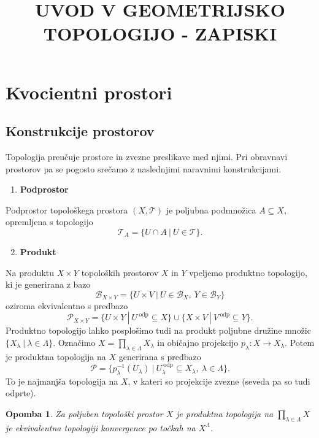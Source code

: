 \documentclass[10pt, a4paper]{article}
\newtheorem*{opomba}{Opomba}
\begin{document}
\title{UVOD V GEOMETRIJSKO TOPOLOGIJO - ZAPISKI}
\date{}
\maketitle

\section{Kvocientni prostori}

\subsection{Konstrukcije prostorov}

Topologija preučuje prostore in zvezne preslikave med njimi.
Pri obravnavi prostorov pa se pogosto srečamo z naslednjimi
naravnimi konstrukcijami.

\begin{enumerate}
  \item \textbf{Podprostor}
\end{enumerate}

Podprostor topološkega prostora $(X, \mathcal{T})$
je poljubna podmnožica $A \subseteq X$, opremljena s topologijo 
$$\mathcal{T}_A = \{U \cap A\ |\ U \in \mathcal{T} \}.$$

\begin{enumerate}
  \setcounter{enumi}{1}
  \item \textbf{Produkt}
\end{enumerate}

Na produktu $X \times Y$ topoloških prostorov 
$X$ in $Y$ vpeljemo produktno topologijo, ki je generirana z bazo 
$$\mathcal{B}_{X \times Y} = \{U \times V\ |\ U \in \mathcal{B}_X,\ Y \in \mathcal{B}_Y\}$$
oziroma ekvivalentno s predbazo 
$$\mathcal{P}_{X \times Y} = \{U \times Y\ |\ U^{\ \text{odp}} \subseteq X\} \cup \{X \times V\ |\ V^{\ \text{odp}} \subseteq Y\}.$$
Produktno topologijo lahko posplošimo tudi na produkt poljubne družine množic $\{X_\lambda\ |\ \lambda \in \Lambda\}$.
Označimo $X = \prod_{\lambda \in \Lambda} X_\lambda$ in običajno projekcijo $p_\lambda: X \to X_\lambda$.
Potem je produktna topologija na $X$ generirana s predbazo 
$$\mathcal{P} = \{p_\lambda ^{-1} (U_\lambda)\ |\ U_{\lambda} ^{\ \text{odp}} \subseteq X_\lambda,\ \lambda \in \Lambda\}.$$
To je najmanjša topologija na $X$, v kateri so projekcije zvezne (seveda pa so tudi odprte).

\begin{opomba}
  Za poljuben topološki prostor $X$ je produktna topologija na $\prod_{\lambda \in \Lambda} X$ je ekvivalentna topologiji konvergence po točkah 
  na $X^\Lambda$.
\end{opomba}
\end{document}
